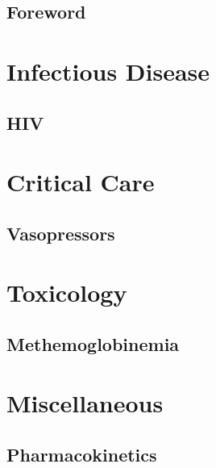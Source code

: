 \documentclass[10pt,openany]{book}
\begin{document}




\renewcommand{\contentsname}{\color{mainColor} Contents}
\tableofcontents

\chapter*{Foreword}



\part{Infectious Disease}

\begin{refsection}
	\chapter{HIV} \label{ch:hiv}
	
\end{refsection}

\part{Critical Care}

\begin{refsection}
\chapter{Vasopressors} \label{ch:vasopressors}

\end{refsection}

\part{Toxicology}

\begin{refsection}
\chapter{Methemoglobinemia} \label{ch:methemoglobinemia}

\end{refsection}


\part{Miscellaneous}

\begin{refsection}
\chapter{Pharmacokinetics} \label{ch:pk}

\end{refsection}
\end{document}
